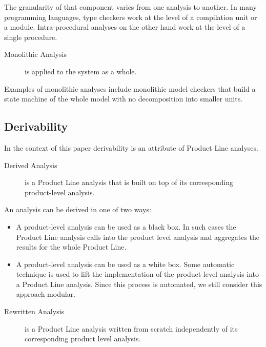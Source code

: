 \documentclass[11pt, english]{article}
\begin{document}
The granularity of that component varies from one analysis to another. In many programming languages, type checkers work at the level of a compilation unit or a module. Intra-procedural analyses on the other hand work at the level of a single procedure. 

\begin{description}
\item [Monolithic Analysis]
is applied to the system as a whole. 
\end{description}

Examples of monolithic analyses include monolithic model checkers that build a state machine of the whole model with no decomposition into smaller units.

\subsection{Derivability}

In the context of this paper derivability is an attribute of Product Line analyses.

\begin{description}
\item [Derived Analysis]
is a  Product Line analysis that is built on top of its corresponding product-level analysis. 
\end{description}

An analysis can be derived in one of two ways:

\begin{itemize}

\item A product-level analysis can be used as a black box. In such cases the Product Line analysis calls into the product level analysis and aggregates the results for the whole Product Line.

\item A product-level analysis can be used as a white box. Some automatic technique is used to lift the implementation of the product-level analysis into a Product Line analysis. Since this process is automated, we still consider this approach modular.
\end{itemize}

\begin{description}

\item [Rewritten Analysis]
is a Product Line analysis written from scratch independently of its corresponding product level analysis.
\end{description}
\end{document}
